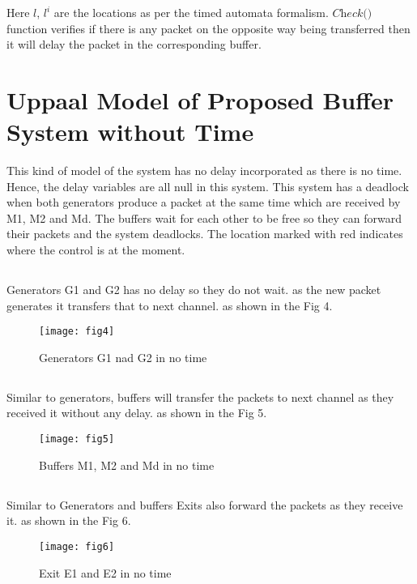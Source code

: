 \documentclass[letterpaper]{article}
\begin{document}
Here $l$, $l^{i}$ are the locations as per the timed automata formalism. $\textit{Check()}$ function verifies if there is any packet on the opposite way being transferred then it will delay the packet in the corresponding buffer. 



\section{Uppaal Model of Proposed  Buffer System without Time}
\label{8}
This kind of model of the system has no delay incorporated as there is no time. Hence, the delay variables are all null in this system. This system has a deadlock when both generators produce a packet at the same time which are received by M1, M2 and Md. The buffers wait for each other to be free so they can forward their packets and the system deadlocks.  The location marked with red indicates where the control is at the moment.

\subsection{} Generators G1 and G2 has no delay so they do not wait. as the new packet generates it transfers that to next channel. as shown in the Fig 4.
\begin{figure}[bpht!]
\centering
	\texttt{[image: fig4]}
		\caption{Generators G1 nad G2 in no time}
	\label{Fig 4}
\end{figure}

\subsection{} Similar to generators, buffers will transfer the packets to next channel as they received it without any delay. as shown in the Fig 5.
\begin{figure}[bpht!]
\centering
	\texttt{[image: fig5]}
		\caption{Buffers M1, M2 and Md in no time}
	\label{Fig5}
\end{figure}

\subsection{} Similar to Generators and buffers Exits also forward the packets as they receive it. as shown in the Fig 6.
\begin{figure}[bpht!]
\centering
	\texttt{[image: fig6]}
		\caption{Exit E1 and E2 in no time}
	\label{Fig 6}
\end{figure}
\end{document}
